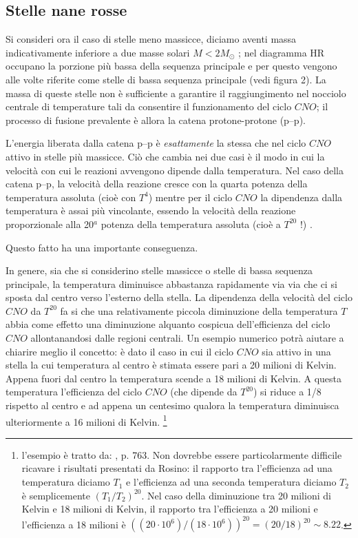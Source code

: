 \subsection{Stelle nane rosse}\label{nane rosse}
Si consideri ora il caso di stelle meno massicce, diciamo aventi massa indicativamente inferiore a due masse solari $M<2M_{\odot}$ \Cite{collins}; nel diagramma HR occupano la porzione più bassa della sequenza principale e per questo vengono alle volte riferite come stelle di bassa sequenza principale (vedi figura 2).
%
%
La massa di queste stelle non è sufficiente a garantire il raggiungimento nel nocciolo centrale di temperature tali da consentire il funzionamento del ciclo $CNO$; il processo di fusione prevalente è allora la catena protone-protone (p--p).
\par
L'energia liberata dalla catena p--p è \emph{esattamente} la stessa che nel ciclo $CNO$ attivo in stelle più massicce.
Ciò che cambia nei due casi è il modo in cui la velocit\`{a} con cui le reazioni avvengono dipende dalla temperatura.
Nel caso della catena p--p, la velocit\`{a} della reazione cresce con la quarta potenza della temperatura assoluta (cioè con $T^{4}$) mentre per il ciclo $CNO$ la dipendenza dalla temperatura è assai più vincolante, essendo la velocit\`{a} della reazione proporzionale alla 20$^{a}$ potenza della temperatura assoluta (cioè a $T^{20}$ !) \Cite{rosino}.
\par
Questo fatto ha una importante conseguenza.
\par
In genere, sia che si considerino stelle massicce o stelle di bassa sequenza principale, la temperatura diminuisce abbastanza rapidamente via via che ci si sposta dal centro verso l'esterno della stella.
La dipendenza della velocit\`{a} del ciclo $CNO$ da $T^{20}$ fa si che una relativamente piccola diminuzione della temperatura $T$ abbia come effetto una diminuzione alquanto cospicua dell'efficienza del ciclo $CNO$ allontanandosi dalle regioni centrali. Un esempio numerico potr\`{a} aiutare a chiarire meglio il concetto: 
è dato il caso in cui il ciclo $CNO$ sia attivo in una stella la cui temperatura al centro è stimata essere pari a 20 milioni di Kelvin. Appena fuori dal centro la temperatura scende a 18 milioni di Kelvin.
A questa temperatura l'efficienza del ciclo $CNO$ (che dipende da $T^{20}$) si riduce a 1/8 rispetto al centro e ad appena un centesimo qualora la temperatura diminuisca ulteriormente a 16 milioni di Kelvin.
\footnote{l'esempio è tratto da: \Cite{rosino}, p. 763. Non dovrebbe essere particolarmente difficile ricavare i risultati presentati da Rosino: il rapporto tra l'efficienza ad una temperatura diciamo $T_{1}$ e l'efficienza ad una seconda temperatura diciamo $T_{2}$ è semplicemente $(T_{1} / T_{2})^{20}$.
Nel caso della diminuzione tra 20 milioni di Kelvin e 18 milioni di Kelvin, il rapporto tra l'efficienza a 20 milioni e l'efficienza a 18 milioni è $\left( (20 \cdot 10^{6})/(18 \cdot 10^{6}) \right) ^{20}= (20/18)^{20} \sim 8.22$.}

